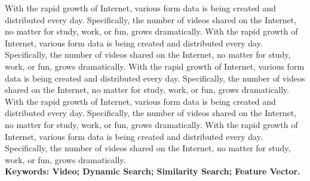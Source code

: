 \documentclass[a4paper,12pt,UTF8]{ctexart}
\begin{document}
\begin{spacing}{1.1}
With the rapid growth of Internet, various form data is being created and distributed every day. Specifically, the number of videos shared on the Internet, no matter for study, work, or fun, grows dramatically. With the rapid growth of Internet, various form data is being created and distributed every day. Specifically, the number of videos shared on the Internet, no matter for study, work, or fun, grows dramatically. With the rapid growth of Internet, various form data is being created and distributed every day. Specifically, the number of videos shared on the Internet, no matter for study, work, or fun, grows dramatically. With the rapid growth of Internet, various form data is being created and distributed every day. Specifically, the number of videos shared on the Internet, no matter for study, work, or fun, grows dramatically. With the rapid growth of Internet, various form data is being created and distributed every day. Specifically, the number of videos shared on the Internet, no matter for study, work, or fun, grows dramatically.  \vspace{3mm}
\\\textbf{Keywords: Video; Dynamic Search; Similarity Search; Feature Vector.}  


\end{spacing}
\end{document}
